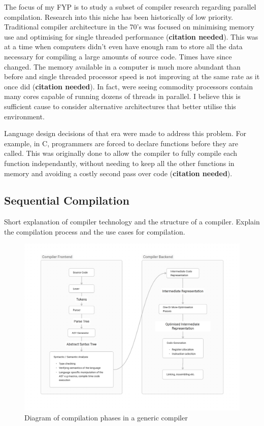 The focus of my FYP is to study a subset of compiler research regarding parallel
compilation. Research into this niche has been historically of low priority.
Traditional compiler architecture in the 70’s was focused on minimising memory
use and optimising for single threaded performance (\textbf{citation needed}).
This was at a time when computers didn’t even have enough ram to store all the
data necessary for compiling a large amounts of source code. Times have since
changed. The memory available in a computer is much more abundant than before
and single threaded processor speed is not improving at the same rate as it
once did (\textbf{citation needed}). In fact, were seeing commodity processors
contain many cores capable of running dozens of threads in parallel. I believe
this is sufficient cause to consider alternative architectures that better
utilise this environment.

\begin{roughwork}

     Language design decisions of that era were made to address this problem.
     For example, in C, programmers are forced to declare functions before
     they are called. This was originally done to allow the compiler to
     fully compile each function independantly, without needing to keep all
     the other functions in memory and avoiding a costly second pass over
     code (\textbf{citation needed}). 

\end{roughwork}

\subsection{Sequential Compilation}
\begin{sectionplan}
     Short explanation of compiler technology and the structure of a compiler.
     Explain the compilation process and the use cases for compilation.
\end{sectionplan}

\begin{figure}[t]
\includegraphics[width=\linewidth]{images/generic_compiler.png}
\centering
\caption{Diagram of compilation phases in a generic compiler}
\label{fig:compiler}
\end{figure}

